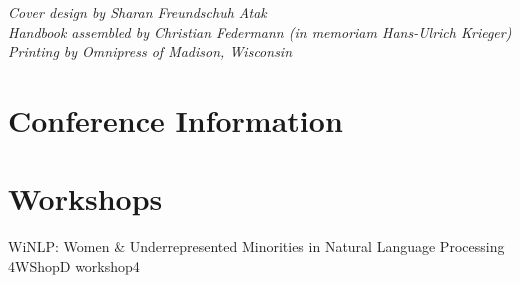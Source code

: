 \documentclass[twoside,makeidx]{book}
\begin{document}

\fancyfoot[C]{}


\thispagestyle{empty}
\vspace*{6in}
\noindent\emph{Cover design by Sharan Freundschuh Atak}\\
\noindent\emph{Handbook assembled by Christian Federmann (in memoriam Hans-Ulrich Krieger)}\\
\noindent\emph{Printing by Omnipress of Madison, Wisconsin}

\newpage
\cleardoublepage
\fancyfoot[C]{\thepage}
\frontmatter

\setcounter{tocdepth}{2}
\tableofcontents
\mainmatter
\pagestyle{fancy}

\chapter{Conference Information}


\clearpage


\clearpage%
\setheaders{}{}


\clearpage%
\setheaders{}{}


\clearpage



\chapter[Workshops: \daydate]{Workshops}


\begin{wsschedule}
  {WiNLP: Women \& Underrepresented Minorities in Natural Language Processing}
  {4}{WShopD}
  {workshop4}
  {\WShopLocD}
  
\end{wsschedule}
\end{document}
